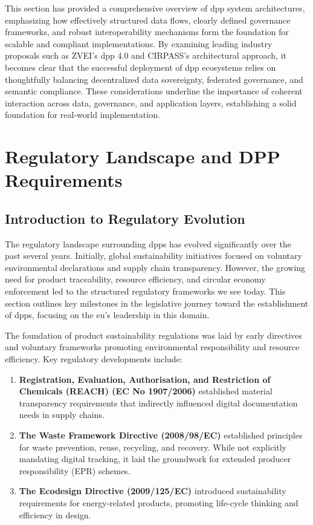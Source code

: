 This section has provided a comprehensive overview of \ac{dpp} system architectures, emphasizing how effectively structured data flows, clearly defined governance frameworks, and robust interoperability mechanisms form the foundation for scalable and compliant implementations. By examining leading industry proposals such as ZVEI’s \ac{dpp} 4.0 and CIRPASS's architectural approach, it becomes clear that the successful deployment of \ac{dpp} ecosystems relies on thoughtfully balancing decentralized data sovereignty, federated governance, and semantic compliance. These considerations underline the importance of coherent interaction across data, governance, and application layers, establishing a solid foundation for real-world implementation.

\section{Regulatory Landscape and DPP Requirements}
\label{sec:regulatory_landscape}

\subsection{Introduction to Regulatory Evolution}

The regulatory landscape surrounding \acrlong{dpp}s has evolved significantly over the past several years. Initially, global sustainability initiatives focused on voluntary environmental declarations and supply chain transparency. However, the growing need for product traceability, resource efficiency, and circular economy enforcement led to the structured regulatory frameworks we see today. This section outlines key milestones in the legislative journey toward the establishment of \ac{dpp}s, focusing on the \acrlong{eu}'s leadership in this domain.

The foundation of product sustainability regulations was laid by early directives and voluntary frameworks promoting environmental responsibility and resource efficiency. Key regulatory developments include:

\begin{enumerate}[itemsep=0.5\baselineskip]
    \item \textbf{Registration, Evaluation, Authorisation, and Restriction of Chemicals (REACH) (EC No 1907/2006)} established material transparency requirements that indirectly influenced digital documentation needs in supply chains. \autocite{EuropeanParliamentandCouncil.2006}
    
    \item \textbf{The Waste Framework Directive (2008/98/EC)} established principles for waste prevention, reuse, recycling, and recovery. While not explicitly mandating digital tracking, it laid the groundwork for extended producer responsibility (EPR) schemes. \autocite{EuropeanParliamentandCouncil.2008}
    
    \item \textbf{The Ecodesign Directive (2009/125/EC)} introduced sustainability requirements for energy-related products, promoting life-cycle thinking and efficiency in design. \autocite{EuropeanParliamentandCouncil.2009}
\end{enumerate}

